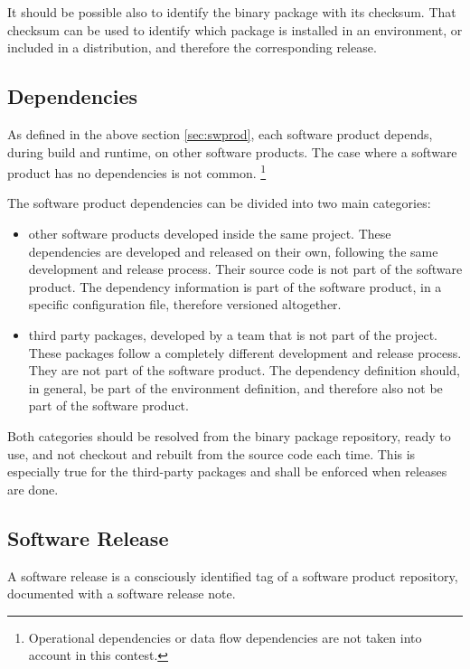 It should be possible also to identify the binary package with its checksum.
That checksum can be used to identify which package is installed in an environment, or included in a distribution, and therefore the corresponding release.


\subsection{Dependencies} \label{sec:dependencies}

As defined in the above section \ref{sec:swprod}, each software product depends, during build and runtime, on other software products.
The case where a software product has no dependencies is not common.
\footnote{Operational dependencies or data flow dependencies are not taken into account in this contest.}

The software product dependencies can be divided into two main categories:

\begin{itemize}
\item other software products developed inside the same project.
These dependencies are developed and released on their own, following the same development and release process.
Their source code is not part of the software product.
The dependency information is part of the software product, in a specific configuration file, therefore versioned altogether.
\item third party packages, developed by a team that is not part of the project.
These packages follow a completely different development and release process.
They are not part of the software product.
The dependency definition should, in general, be part of the environment definition, and therefore also not be part of the software product.
\end{itemize}

Both categories should be resolved from the binary package repository, ready to use, and not checkout and rebuilt from the source code each time.
This is especially true for the third-party packages and shall be enforced when releases are done.


\subsection{Software Release} \label{sec:swrel}

A software release is a consciously identified tag of a software product repository, documented with a software release note.

